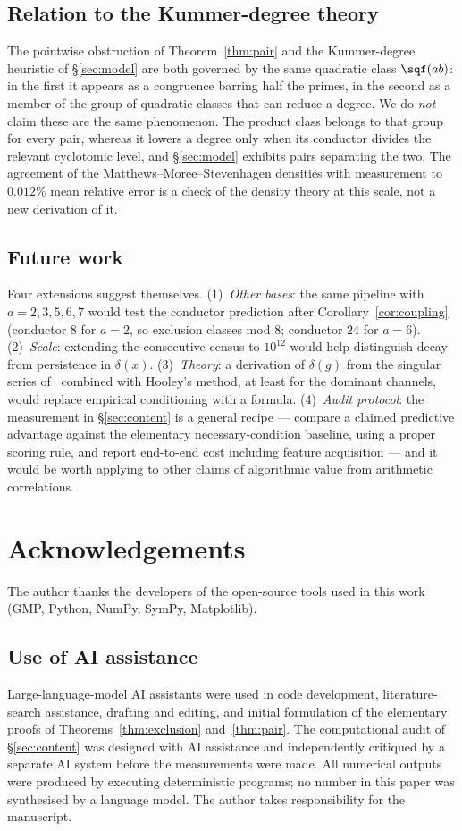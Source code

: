 \subsection*{Relation to the Kummer-degree theory}
The pointwise obstruction of Theorem~\ref{thm:pair} and the Kummer-degree heuristic of
\S\ref{sec:model} are both governed by the same quadratic class $\sqf(ab)$: in the first it
appears as a congruence barring half the primes, in the second as a member of the group of
quadratic classes that can reduce a degree. We do \emph{not} claim these are the same
phenomenon. The product class belongs to that group for every pair, whereas it lowers a
degree only when its conductor divides the relevant cyclotomic level, and
\S\ref{sec:model} exhibits pairs separating the two. The agreement of the
Matthews--Moree--Stevenhagen densities with measurement to $0.012\%$ mean relative error is
a check of the density theory at this scale, not a new derivation of it.

\subsection*{Future work}
Four extensions suggest themselves. (1)~\emph{Other bases}: the same pipeline with
$a=2,3,5,6,7$ would test the conductor prediction after Corollary~\ref{cor:coupling}
(conductor $8$ for $a=2$, so exclusion classes mod $8$; conductor $24$ for $a=6$).
(2)~\emph{Scale}: extending the consecutive census to $10^{12}$ would help distinguish decay
from persistence in $\delta(x)$. (3)~\emph{Theory}: a derivation of $\delta(g)$ from the
singular series of~\cite{HardyLittlewood1923} combined with Hooley's method, at least for
the dominant channels, would replace empirical conditioning with a formula. (4)~\emph{Audit
protocol}: the measurement in \S\ref{sec:content} is a general recipe --- compare a claimed
predictive advantage against the elementary necessary-condition baseline, using a proper
scoring rule, and report end-to-end cost including feature acquisition --- and it would be
worth applying to other claims of algorithmic value from arithmetic correlations.

\section*{Acknowledgements}
The author thanks the developers of the open-source tools used in this work
(GMP, Python, NumPy, SymPy, Matplotlib).

\subsection*{Use of AI assistance}
Large-language-model AI assistants were used in code development, literature-search
assistance, drafting and editing, and initial formulation of the elementary proofs of
Theorems~\ref{thm:exclusion} and~\ref{thm:pair}. The computational audit of
\S\ref{sec:content} was designed with AI assistance and independently critiqued by a
separate AI system before the measurements were made. All numerical outputs were produced by
executing deterministic programs; no number in this paper was synthesised by a language
model. The author takes responsibility for the manuscript.

